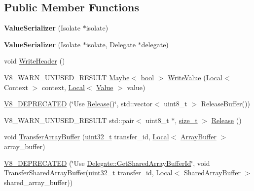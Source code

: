 \subsection*{Public Member Functions}
\begin{DoxyCompactItemize}
\item 
\mbox{\label{classv8_1_1ValueSerializer_a51d1b6f00c48dc3577baeeaa3bdbaf09}} 
{\bfseries Value\+Serializer} (Isolate $\ast$isolate)
\item 
\mbox{\label{classv8_1_1ValueSerializer_a5f37e7f6087acda9a943fb50216e0895}} 
{\bfseries Value\+Serializer} (Isolate $\ast$isolate, \mbox{\hyperlink{classv8_1_1ValueSerializer_1_1Delegate}{Delegate}} $\ast$delegate)
\item 
void \mbox{\hyperlink{classv8_1_1ValueSerializer_ac0bdf1a7731ee4e93823dabdfa8c8661}{Write\+Header}} ()
\item 
V8\+\_\+\+W\+A\+R\+N\+\_\+\+U\+N\+U\+S\+E\+D\+\_\+\+R\+E\+S\+U\+LT \mbox{\hyperlink{classv8_1_1Maybe}{Maybe}}$<$ \mbox{\hyperlink{classbool}{bool}} $>$ \mbox{\hyperlink{classv8_1_1ValueSerializer_abaaf71649f106af23c1c43f12e6a8394}{Write\+Value}} (\mbox{\hyperlink{classv8_1_1Local}{Local}}$<$ Context $>$ context, \mbox{\hyperlink{classv8_1_1Local}{Local}}$<$ \mbox{\hyperlink{classv8_1_1Value}{Value}} $>$ value)
\item 
\mbox{\hyperlink{classv8_1_1ValueSerializer_a64a2c151142bc706a446d15599541ca4}{V8\+\_\+\+D\+E\+P\+R\+E\+C\+A\+T\+ED}} (\char`\"{}Use \mbox{\hyperlink{classv8_1_1ValueSerializer_a5e15aee37a321fd0dc3e92dd87e1334f}{Release}}()\char`\"{}, std\+::vector$<$ uint8\+\_\+t $>$ Release\+Buffer())
\item 
V8\+\_\+\+W\+A\+R\+N\+\_\+\+U\+N\+U\+S\+E\+D\+\_\+\+R\+E\+S\+U\+LT std\+::pair$<$ uint8\+\_\+t $\ast$, \mbox{\hyperlink{classsize__t}{size\+\_\+t}} $>$ \mbox{\hyperlink{classv8_1_1ValueSerializer_a5e15aee37a321fd0dc3e92dd87e1334f}{Release}} ()
\item 
void \mbox{\hyperlink{classv8_1_1ValueSerializer_a27007f2530a496275ccf7b8846f1d9c5}{Transfer\+Array\+Buffer}} (\mbox{\hyperlink{classuint32__t}{uint32\+\_\+t}} transfer\+\_\+id, \mbox{\hyperlink{classv8_1_1Local}{Local}}$<$ \mbox{\hyperlink{classv8_1_1ArrayBuffer}{Array\+Buffer}} $>$ array\+\_\+buffer)
\item 
\mbox{\hyperlink{classv8_1_1ValueSerializer_a4f7e5fe4298a8094817fe9f639112499}{V8\+\_\+\+D\+E\+P\+R\+E\+C\+A\+T\+ED}} (\char`\"{}Use \mbox{\hyperlink{classv8_1_1ValueSerializer_1_1Delegate_ac12b5cfd7480c19f0b9af0b47d05a77e}{Delegate\+::\+Get\+Shared\+Array\+Buffer\+Id}}\char`\"{}, void Transfer\+Shared\+Array\+Buffer(\mbox{\hyperlink{classuint32__t}{uint32\+\_\+t}} transfer\+\_\+id, \mbox{\hyperlink{classv8_1_1Local}{Local}}$<$ \mbox{\hyperlink{classv8_1_1SharedArrayBuffer}{Shared\+Array\+Buffer}} $>$ shared\+\_\+array\+\_\+buffer))

\end{DoxyCompactItemize}
